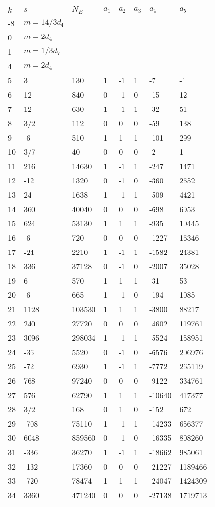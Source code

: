 \documentclass{amsart}
\begin{document}
\begin{longtable}{|l|l|l|lllll|}
\hline
$k$ & $s$ & $N_E$ & $a_1$ & $a_2$ & $a_3$ & $a_4$ & $a_5$\\
\hline
-8&$m=14/3d_{4}$&&\multicolumn{5}{c|}{}\\
0&$m=2d_{4}$&&\multicolumn{5}{c|}{}\\
1&$m=1/3d_{7}$&&\multicolumn{5}{c|}{}\\
4&$m=2d_{4}$&&\multicolumn{5}{c|}{}\\
5&3&130&1&-1&1&-7&-1\\
6&12&840&0&-1&0&-15&12\\
7&12&630&1&-1&1&-32&51\\
8&3/2&112&0&0&0&-59&138\\
9&-6&510&1&1&1&-101&299\\
10&3/7&40&0&0&0&-2&1\\
11&216&14630&1&-1&1&-247&1471\\
12&-12&1320&0&-1&0&-360&2652\\
13&24&1638&1&-1&1&-509&4421\\
14&360&40040&0&0&0&-698&6953\\
15&624&53130&1&1&1&-935&10445\\
16&-6&720&0&0&0&-1227&16346\\
17&-24&2210&1&-1&1&-1582&24381\\
18&336&37128&0&-1&0&-2007&35028\\
19&6&570&1&1&1&-31&53\\
20&-6&665&1&-1&0&-194&1085\\
21&1128&103530&1&1&1&-3800&88217\\
22&240&27720&0&0&0&-4602&119761\\
23&3096&298034&1&-1&1&-5524&158951\\
24&-36&5520&0&-1&0&-6576&206976\\
25&-72&6930&1&-1&1&-7772&265119\\
26&768&97240&0&0&0&-9122&334761\\
27&576&62790&1&1&1&-10640&417377\\
28&3/2&168&0&1&0&-152&672\\
29&-708&75110&1&-1&1&-14233&656377\\
30&6048&859560&0&-1&0&-16335&808260\\
31&-336&36270&1&-1&1&-18662&985061\\
32&-132&17360&0&0&0&-21227&1189466\\
33&-720&78474&1&1&1&-24047&1424309\\
34&3360&471240&0&0&0&-27138&1719713\\

\end{longtable}
\end{document}
